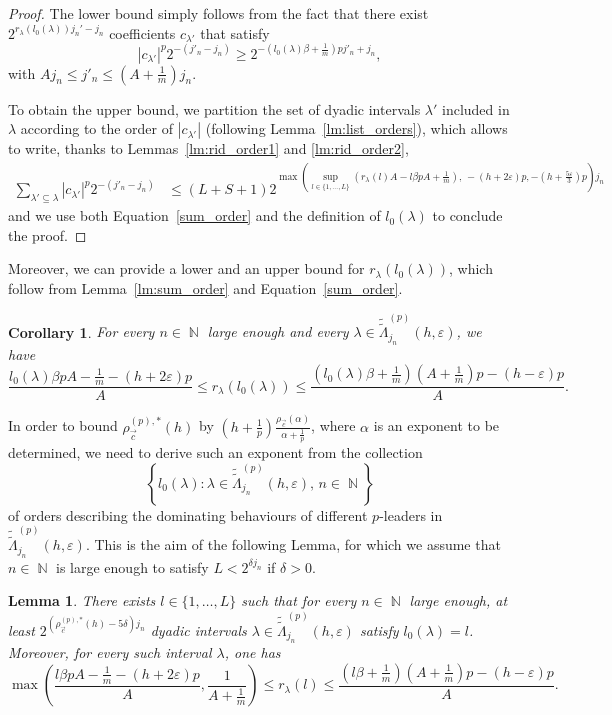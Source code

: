 \documentclass[a4paper,11pt,oneside]{article}
\DeclareMathOperator{\N}{\mathbb{N}}
\newcommand{\modu}[1]{\left\vert{#1}\right\vert}
\theoremstyle{definition}
\theoremstyle{plain}
\newtheorem{lemma}[defi]{Lemma}
\newtheorem{cor}[defi]{Corollary}
\begin{document}
\begin{proof}
The lower bound simply follows from the fact that there exist $2^{r_\lambda(l_0(\lambda))j_n'-j_n}$ coefficients $c_{\lambda'}$ that satisfy
\[
\modu{c_{\lambda'}}^p2^{-(j'_n-j_n)}\geq 2^{-\left(l_0(\lambda)\beta+\frac{1}{m}\right)pj'_n+j_n},
\]
with $Aj_n\leq j'_n\leq \left(A+\frac{1}{m}\right)j_n$.

To obtain the upper bound, we partition the set of dyadic intervals $\lambda'$ included in $\lambda$ according to the order of $\modu{c_{\lambda'}}$ (following Lemma~\ref{lm:list_orders}), which allows to write, thanks to Lemmas~\ref{lm:rid_order1} and \ref{lm:rid_order2},
\begin{align*}
\sum_{\lambda'\subseteq\lambda}\modu{c_{\lambda'}}^p2^{-(j'_n-j_n)}
& \leq (L+S+1)2^{\max\left(\sup_{l\in\{1,\ldots,L\}}\left(r_\lambda(l)A-l\beta pA+\frac{1}{m}\right),\,-(h+2\varepsilon)p,-\left(h+\frac{5\varepsilon}{3}\right)p\right) j_n}
\end{align*}
and we use both Equation~\eqref{sum_order} and the definition of $l_0(\lambda)$ to conclude the proof.
\end{proof}

Moreover, we can provide a lower and an upper bound for $r_\lambda(l_0(\lambda))$, which follow from Lemma~\ref{lm:sum_order} and Equation~\eqref{sum_order}.

\begin{cor}\label{cor:r_lambda}
For every $n\in\N$ large enough and every $\lambda\in\widetilde{\widetilde{\Lambda}}_{j_n}^{(p)}(h,\varepsilon)$, we have
\[
 \frac{l_0(\lambda)\beta pA-\frac{1}{m}-(h+2\varepsilon)p}{A} \leq r_\lambda(l_0(\lambda)) \leq \frac{\left(l_0(\lambda)\beta+\frac{1}{m}\right)\left(A+\frac{1}{m}\right)p-(h-\varepsilon)p}{A}.
\]
\end{cor}

In order to bound $\rho_{\vec{c}}^{(p),\ast}(h)$ by $\left(h+\frac{1}{p}\right)\frac{\rho_{\vec{c}}(\alpha)}{\alpha+\frac{1}{p}}$, where $\alpha$ is an exponent to be determined, we need to derive such an exponent from the collection
\[
\left\{l_0(\lambda) : \lambda\in\widetilde{\widetilde{\Lambda}}_{j_n}^{(p)}(h,\varepsilon), \, n\in\N\right\}
\]
of orders describing the dominating behaviours of different $p$-leaders in $\widetilde{\widetilde{\Lambda}}_{j_n}^{(p)}(h,\varepsilon)$. This is the aim of the following Lemma, for which we assume that $n\in\N$ is large enough to satisfy $L<2^{\delta j_n}$ if $\delta>0$.


\begin{lemma}\label{lm:l}
There exists $l\in\{1,\ldots,L\}$ such that for every $n\in\N$ large enough, at least $2^{(\rho_{\vec{c}}^{(p),\ast}(h)-5\delta)j_n}$ dyadic intervals $\lambda\in\widetilde{\widetilde{\Lambda}}_{j_n}^{(p)}(h,\varepsilon)$
satisfy $l_0(\lambda)=l$. Moreover, for every such interval $\lambda$,
one has \begin{equation}\label{r_lambda}
\max\left(\frac{l\beta pA-\frac{1}{m}-(h+2\varepsilon)p}{A},\frac{1}{A+\frac{1}{m}}\right) \leq r_{\lambda}(l) \leq \frac{\left(l\beta+\frac{1}{m}\right)\left(A+\frac{1}{m}\right)p-(h-\varepsilon)p}{A}.
\end{equation}
\end{lemma}
\end{document}
